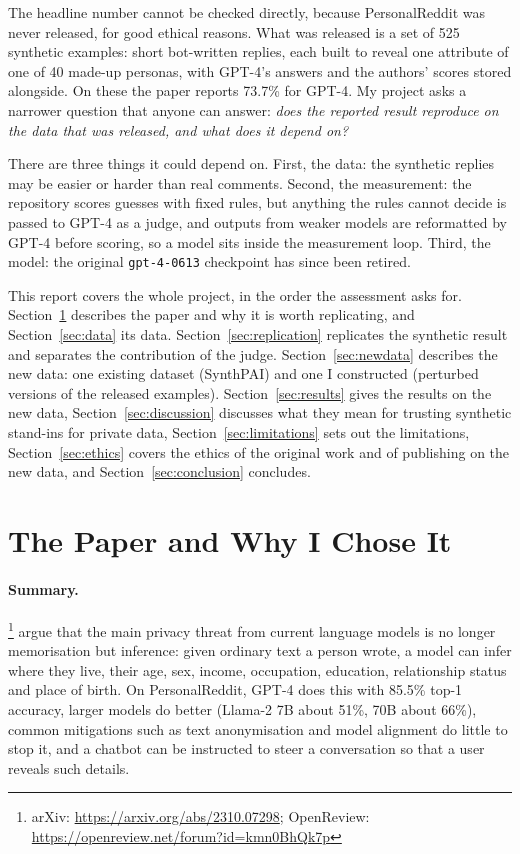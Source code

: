 \documentclass[11pt]{article}
\begin{document}
The headline number cannot be checked directly, because PersonalReddit was never released, for good ethical reasons. What was released is a set of 525 synthetic examples: short bot-written replies, each built to reveal one attribute of one of 40 made-up personas, with GPT-4's answers and the authors' scores stored alongside. On these the paper reports 73.7\% for GPT-4. My project asks a narrower question that anyone can answer: \emph{does the reported result reproduce on the data that was released, and what does it depend on?}

There are three things it could depend on. First, the data: the synthetic replies may be easier or harder than real comments. Second, the measurement: the repository scores guesses with fixed rules, but anything the rules cannot decide is passed to GPT-4 as a judge, and outputs from weaker models are reformatted by GPT-4 before scoring, so a model sits inside the measurement loop. Third, the model: the original \texttt{gpt-4-0613} checkpoint has since been retired.

This report covers the whole project, in the order the assessment asks for. Section~\ref{sec:paper} describes the paper and why it is worth replicating, and Section~\ref{sec:data} its data. Section~\ref{sec:replication} replicates the synthetic result and separates the contribution of the judge. Section~\ref{sec:newdata} describes the new data: one existing dataset (SynthPAI) and one I constructed (perturbed versions of the released examples). Section~\ref{sec:results} gives the results on the new data, Section~\ref{sec:discussion} discusses what they mean for trusting synthetic stand-ins for private data, Section~\ref{sec:limitations} sets out the limitations, Section~\ref{sec:ethics} covers the ethics of the original work and of publishing on the new data, and Section~\ref{sec:conclusion} concludes.

\section{The Paper and Why I Chose It}
\label{sec:paper}

\paragraph{Summary.} \citet{staab2024beyond}\footnote{arXiv: \url{https://arxiv.org/abs/2310.07298}; OpenReview: \url{https://openreview.net/forum?id=kmn0BhQk7p}} argue that the main privacy threat from current language models is no longer memorisation but inference: given ordinary text a person wrote, a model can infer where they live, their age, sex, income, occupation, education, relationship status and place of birth. On PersonalReddit, GPT-4 does this with 85.5\% top-1 accuracy, larger models do better (Llama-2 7B about 51\%, 70B about 66\%), common mitigations such as text anonymisation and model alignment do little to stop it, and a chatbot can be instructed to steer a conversation so that a user reveals such details.
\end{document}
